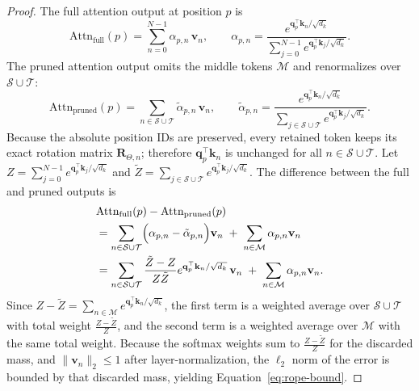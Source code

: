 \begin{proof}
The full attention output at position $p$ is
\begin{equation}
\text{Attn}_{\text{full}}(p)
= \sum_{n=0}^{N-1} \alpha_{p,n} \, \mathbf{v}_n,
\qquad
\alpha_{p,n}
= \frac{e^{\mathbf{q}_p^{\top} \mathbf{k}_n / \sqrt{d_k}}}
        {\sum_{j=0}^{N-1} e^{\mathbf{q}_p^{\top} \mathbf{k}_j / \sqrt{d_k}}}.
\end{equation}
The pruned attention output omits the middle tokens $\mathcal{M}$ and
renormalizes over $\mathcal{S} \cup \mathcal{T}$:
\begin{equation}
\text{Attn}_{\text{pruned}}(p)
= \sum_{n \in \mathcal{S} \cup \mathcal{T}}
  \tilde{\alpha}_{p,n} \, \mathbf{v}_n,
\qquad
\tilde{\alpha}_{p,n}
= \frac{e^{\mathbf{q}_p^{\top} \mathbf{k}_n / \sqrt{d_k}}}
        {\sum_{j \in \mathcal{S} \cup \mathcal{T}}
         e^{\mathbf{q}_p^{\top} \mathbf{k}_j / \sqrt{d_k}}}.
\end{equation}
Because the absolute position IDs are preserved, every retained token keeps its
exact rotation matrix $\mathbf{R}_{\Theta,n}$; therefore
$\mathbf{q}_p^{\top} \mathbf{k}_n$ is unchanged for all $n \in \mathcal{S} \cup \mathcal{T}$.
Let $Z = \sum_{j=0}^{N-1} e^{\mathbf{q}_p^{\top} \mathbf{k}_j / \sqrt{d_k}}$ and
$\tilde{Z} = \sum_{j \in \mathcal{S} \cup \mathcal{T}}
e^{\mathbf{q}_p^{\top} \mathbf{k}_j / \sqrt{d_k}}$.
The difference between the full and pruned outputs is
\begin{align}
&\text{Attn}_{\text{full}}(p) - \text{Attn}_{\text{pruned}}(p) \nonumber \\
&= \sum_{n \in \mathcal{S} \cup \mathcal{T}}
   \Bigl(\alpha_{p,n} - \tilde{\alpha}_{p,n}\Bigr) \mathbf{v}_n
   \;+\; \sum_{n \in \mathcal{M}} \alpha_{p,n} \mathbf{v}_n \\
&= \sum_{n \in \mathcal{S} \cup \mathcal{T}}
   \frac{\tilde{Z}-Z}{Z \tilde{Z}}
   e^{\mathbf{q}_p^{\top} \mathbf{k}_n / \sqrt{d_k}} \, \mathbf{v}_n
   \;+\; \sum_{n \in \mathcal{M}} \alpha_{p,n} \mathbf{v}_n.
\end{align}
Since $Z - \tilde{Z} = \sum_{n \in \mathcal{M}}
e^{\mathbf{q}_p^{\top} \mathbf{k}_n / \sqrt{d_k}}$, the first term is a weighted
average over $\mathcal{S} \cup \mathcal{T}$ with total weight
$\frac{Z-\tilde{Z}}{Z}$, and the second term is a weighted average over
$\mathcal{M}$ with the same total weight.  Because the softmax weights sum to
$\frac{Z-\tilde{Z}}{Z}$ for the discarded mass, and $\|\mathbf{v}_n\|_2 \le 1$
after layer-normalization, the $\ell_2$ norm of the error is bounded by that
discarded mass, yielding Equation~\eqref{eq:rope-bound}.
\end{proof}

